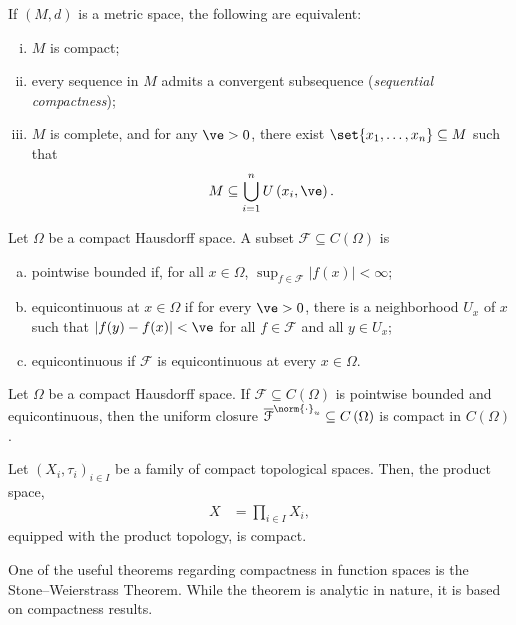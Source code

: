 \begin{fact}
  If $\left(M,d\right)$ is a metric space, the following are equivalent:
  \begin{enumerate}[(i)]
    \item $M$ is compact;
    \item every sequence in $M$ admits a convergent subsequence (\textit{sequential compactness});
    \item $M$ is complete, and for any $\ve > 0$, there exist $\set{x_1,\dots,x_n}\subseteq M$ such that
      \begin{align*}
        M\subseteq \bigcup_{i=1}^{n}U\left( x_i,\ve \right).
      \end{align*}
  \end{enumerate}
\end{fact}
\begin{definition}
  Let $\Omega$ be a compact Hausdorff space. A subset $\mathcal{F}\subseteq C\left(\Omega\right)$ is
  \begin{enumerate}[(a)]
    \item pointwise bounded if, for all $x\in \Omega$, $\sup_{f\in \mathcal{F}}\left\vert f(x) \right\vert < \infty$;
    \item equicontinuous at $x\in \Omega$ if for every $\ve > 0$, there is a neighborhood $U_x$ of $x$ such that $\left\vert f(y) - f(x) \right\vert < \ve$ for all $f\in \mathcal{F}$ and all $y\in U_x$;
    \item equicontinuous if $\mathcal{F}$ is equicontinuous at every $x\in \Omega$.
  \end{enumerate}
\end{definition}
\begin{theorem}\label{thm:arzela_ascoli}
  Let $\Omega$ be a compact Hausdorff space. If $\mathcal{F}\subseteq C\left(\Omega\right)$ is pointwise bounded and equicontinuous, then the uniform closure $\overline{\mathcal{F}}^{\norm{\cdot}_u}\subseteq C\left(\Omega\right)$ is compact in $C\left(\Omega\right)$.
\end{theorem}
\begin{theorem}\label{thm:tychonoff}
  Let $\left(X_i,\tau_i\right)_{i\in I}$ be a family of compact topological spaces. Then, the product space,
  \begin{align*}
    X &= \prod_{i\in I}X_i,
  \end{align*}
  equipped with the product topology, is compact.
\end{theorem}
One of the useful theorems regarding compactness in function spaces is the Stone--Weierstrass Theorem. While the theorem is analytic in nature, it is based on compactness results.
